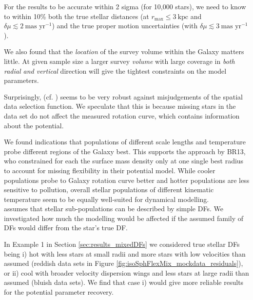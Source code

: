 For the results to be accurate within 2 sigma (for 10,000 stars), we need to know to within 10\% both the true stellar distances (at $r_\text{max} \leq 3~\text{kpc}$ and $\delta \mu \lesssim 2 ~ \text{mas yr}^{-1}$) and the true proper motion uncertainties (with $\delta \mu \lesssim 3 ~ \text{mas yr}^{-1}$).

We also found that the \emph{location} of the survey volume within the Galaxy matters little. At given sample size a larger survey \emph{volume} with large coverage in \emph{both radial and vertical} direction will give the tightest constraints on the model parameters.

Surprisingly, (cf. \citealt{2013A&ARv..21...61R}) \RM{} seems to be very robust against misjudgements of the spatial data selection function. We speculate that this is because missing stars in the data set do not affect the measured rotation curve, which contains information about the potential.

We found indications that populations of different scale lengths and temperature probe different regions of the Galaxy best. This supports the approach by BR13, who constrained for each \MAP{} the surface mass density only at one single best radius to account for missing flexibility in their potential model. While cooler populations probe to Galaxy rotation curve better and hotter populations are less sensitive to pollution, overall stellar populations of different kinematic temperature seem to be equally well-suited for dynamical modelling.\\


 \RM{} assumes that stellar sub-populations can be described by simple DFs. We investigated how much the modelling would be affected if the assumed family of DFs would differ from the star's true DF.

In Example 1 in Section \ref{sec:results_mixedDFs} we considered true stellar DFs being i) hot with less stars at small radii and more stars with low velocities than assumed (reddish data sets in Figure \ref{fig:isoSphFlexMix_mockdata_residuals}), or ii) cool with broader velocity dispersion wings and less stars at large radii than assumed (bluish data sets). We find that case i) would give more reliable results for the potential parameter recovery.

